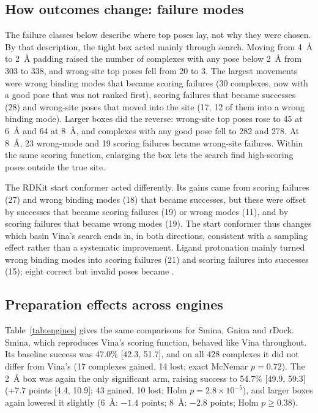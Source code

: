 \subsection{How outcomes change: failure modes}

The failure classes below describe where top poses lay, not why they were chosen. By that
description, the tight box acted mainly through search. Moving from \SI{4}{\angstrom} to
\SI{2}{\angstrom} padding raised the number of complexes with any pose below
\SI{2}{\angstrom} from 303 to 338, and wrong-site top poses fell from 20 to 3. The largest
movements were wrong binding modes that became scoring failures (30 complexes, now with a
good pose that was not ranked first), scoring failures that became successes (28) and
wrong-site poses that moved into the site (17, 12 of them into a wrong binding mode). Larger boxes did the reverse: wrong-site top
poses rose to 45 at \SI{6}{\angstrom} and 64 at \SI{8}{\angstrom}, and complexes with any
good pose fell to 282 and 278. At \SI{8}{\angstrom}, 23 wrong-mode and 19 scoring failures
became wrong-site failures. Within the same scoring function, enlarging the box lets the
search find high-scoring poses outside the true site.

The RDKit start conformer acted differently. Its gains came from scoring failures (27) and
wrong binding modes (18) that became successes, but these were offset by successes that
became scoring failures (19) or wrong modes (11), and by scoring failures that became wrong
modes (19). The start conformer thus changes which basin Vina's search ends in, in both
directions, consistent with a sampling effect rather than a systematic improvement.
Ligand protonation mainly turned wrong binding modes into scoring failures (21) and scoring
failures into successes (15); eight correct but invalid poses became \pbvalid{}.

\subsection{Preparation effects across engines}

Table~\ref{tab:engines} gives the same comparisons for Smina, Gnina and rDock. Smina, which reproduces Vina's scoring function, behaved like Vina
throughout. Its baseline success was 47.0\% [42.3, 51.7], and on all 428 complexes it did
not differ from Vina's (17 complexes gained, 14 lost; exact McNemar $p = 0.72$). The
\SI{2}{\angstrom} box was again the only significant arm, raising success to 54.7\%
[49.9, 59.3] (+7.7 points [4.4, 10.9]; 43 gained, 10 lost; Holm $p = 2.8 \times 10^{-5}$), and larger
boxes again lowered it slightly (\SI{6}{\angstrom}: $-1.4$ points; \SI{8}{\angstrom}:
$-2.8$ points; Holm $p \ge 0.38$).

